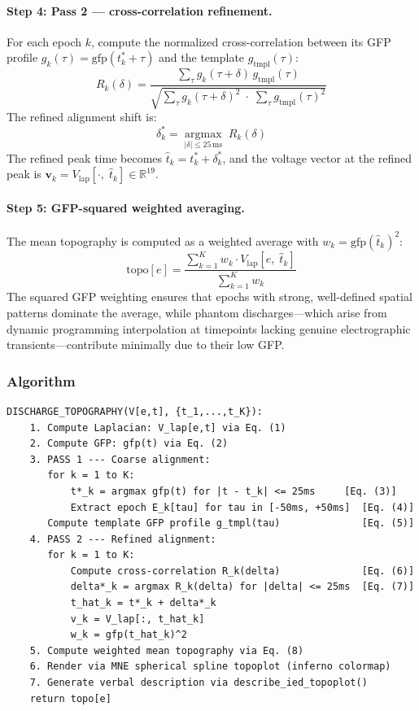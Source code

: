 \paragraph{Step 4: Pass 2 --- cross-correlation refinement.}
For each epoch $k$, compute the normalized cross-correlation between its GFP profile $g_k(\tau) = \mathrm{gfp}(t_k^* + \tau)$ and the template $g_{\mathrm{tmpl}}(\tau)$:
\[ R_k(\delta) = \frac{\sum_{\tau} g_k(\tau + \delta)\, g_{\mathrm{tmpl}}(\tau)}{\sqrt{\sum_{\tau} g_k(\tau+\delta)^2 \;\cdot\; \sum_{\tau} g_{\mathrm{tmpl}}(\tau)^2}} \tag{6} \]
The refined alignment shift is:
\[ \delta_k^* = \underset{|\delta| \leq 25\,\mathrm{ms}}{\operatorname{argmax}}\; R_k(\delta) \tag{7} \]
The refined peak time becomes $\hat{t}_k = t_k^* + \delta_k^*$, and the voltage vector at the refined peak is $\mathbf{v}_k = V_{\mathrm{lap}}[\cdot,\; \hat{t}_k] \in \mathbb{R}^{19}$.

\paragraph{Step 5: GFP-squared weighted averaging.}
The mean topography is computed as a weighted average with $w_k = \mathrm{gfp}(\hat{t}_k)^2$:
\[ \mathrm{topo}[e] = \frac{\sum_{k=1}^{K} w_k \cdot V_{\mathrm{lap}}[e,\; \hat{t}_k]}{\sum_{k=1}^{K} w_k} \tag{8} \]
The squared GFP weighting ensures that epochs with strong, well-defined spatial patterns dominate the average, while phantom discharges---which arise from dynamic programming interpolation at timepoints lacking genuine electrographic transients---contribute minimally due to their low GFP.

\subsubsection{Algorithm}

\begin{verbatim}
DISCHARGE_TOPOGRAPHY(V[e,t], {t_1,...,t_K}):
    1. Compute Laplacian: V_lap[e,t] via Eq. (1)
    2. Compute GFP: gfp(t) via Eq. (2)
    3. PASS 1 --- Coarse alignment:
       for k = 1 to K:
           t*_k = argmax gfp(t) for |t - t_k| <= 25ms     [Eq. (3)]
           Extract epoch E_k[tau] for tau in [-50ms, +50ms]  [Eq. (4)]
       Compute template GFP profile g_tmpl(tau)              [Eq. (5)]
    4. PASS 2 --- Refined alignment:
       for k = 1 to K:
           Compute cross-correlation R_k(delta)              [Eq. (6)]
           delta*_k = argmax R_k(delta) for |delta| <= 25ms  [Eq. (7)]
           t_hat_k = t*_k + delta*_k
           v_k = V_lap[:, t_hat_k]
           w_k = gfp(t_hat_k)^2
    5. Compute weighted mean topography via Eq. (8)
    6. Render via MNE spherical spline topoplot (inferno colormap)
    7. Generate verbal description via describe_ied_topoplot()
    return topo[e]
\end{verbatim}

